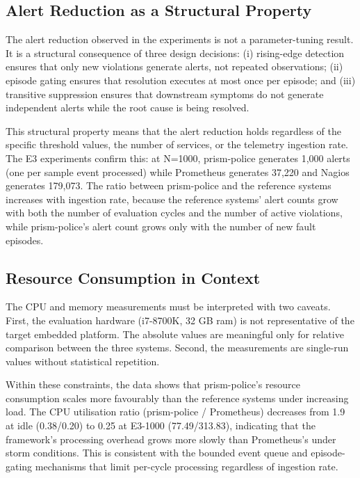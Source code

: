\subsection{Alert Reduction as a Structural Property}

The alert reduction observed in the experiments is not a parameter-tuning result. It is a structural consequence of three design decisions: (i) rising-edge detection ensures that only new violations generate alerts, not repeated observations; (ii) episode gating ensures that resolution executes at most once per episode; and (iii) transitive suppression ensures that downstream symptoms do not generate independent alerts while the root cause is being resolved.

This structural property means that the alert reduction holds regardless of the specific threshold values, the number of services, or the telemetry ingestion rate. The E3 experiments confirm this: at N=1000, prism-police generates 1,000 alerts (one per sample event processed) while Prometheus generates 37,220 and Nagios generates 179,073. The ratio between prism-police and the reference systems increases with ingestion rate, because the reference systems' alert counts grow with both the number of evaluation cycles and the number of active violations, while prism-police's alert count grows only with the number of new fault episodes.

\subsection{Resource Consumption in Context}

The CPU and memory measurements must be interpreted with two caveats. First, the evaluation hardware (i7-8700K, 32 GB \gls{ram}) is not representative of the target embedded platform. The absolute values are meaningful only for relative comparison between the three systems. Second, the measurements are single-run values without statistical repetition.

Within these constraints, the data shows that prism-police's resource consumption scales more favourably than the reference systems under increasing load. The CPU utilisation ratio (prism-police / Prometheus) decreases from 1.9 at idle (0.38/0.20) to 0.25 at E3-1000 (77.49/313.83), indicating that the framework's processing overhead grows more slowly than Prometheus's under storm conditions. This is consistent with the bounded event queue and episode-gating mechanisms that limit per-cycle processing regardless of ingestion rate.

